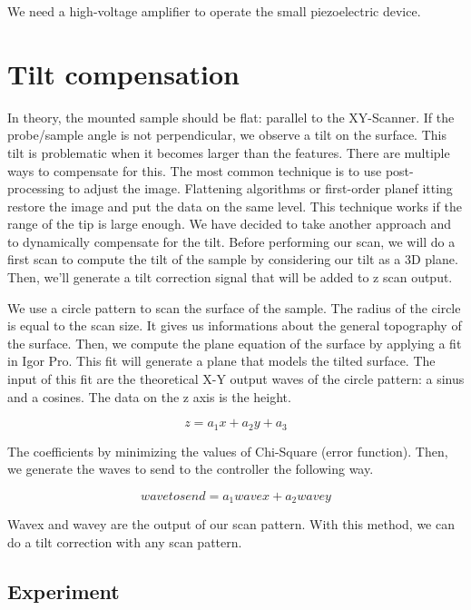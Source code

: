 We need a high-voltage amplifier to operate the small piezoelectric device. 

\section{Tilt compensation}

In theory, the mounted sample should be flat: parallel to the XY-Scanner. If the probe/sample angle is not perpendicular, we observe a tilt on the surface. This tilt is problematic when it becomes larger than the features. There are multiple ways to compensate for this. The most common technique is to use post-processing to adjust the image. Flattening algorithms or first-order planef itting restore the image and put the data on the same level. This technique works if the range of the tip is large enough. We have decided to take another approach and to dynamically compensate for the tilt. Before performing our scan, we will do a first scan to compute the tilt of the sample by considering our tilt as a 3D plane. Then, we'll generate a tilt correction signal that will be added to z scan output.

We use a circle pattern to scan the surface of the sample. The radius of the circle is equal to the scan size. It gives us informations about the general topography of the surface. Then, we compute the plane equation of the surface by applying a fit in Igor Pro. This fit will generate a plane that models the tilted surface. The input of this fit are the theoretical X-Y output waves of the circle pattern: a sinus and a cosines. The data on the z axis is the height.

\begin{equation}\label{eqn:planeeq}
z = a_1 x + a_2 y + a_3 
\end{equation}

The coefficients by minimizing the values of Chi-Square (error function). Then, we generate the waves to send to the controller the following way.

\begin{equation}\label{eqn:sendwave}
wavetosend = a_1 wavex + a_2 wavey 
\end{equation}

Wavex and wavey are the output of our scan pattern. With this method, we can do a tilt correction with any scan pattern.


\subsection{Experiment}

